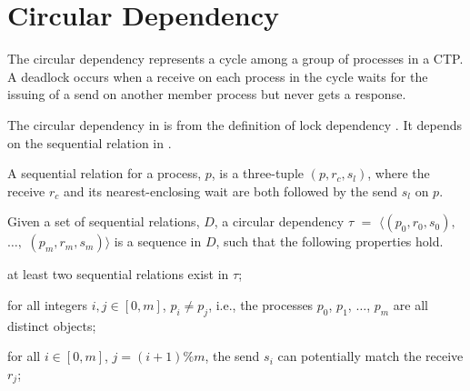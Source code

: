 \section{Circular Dependency}

\examplefigfour

The circular dependency represents a cycle among a group of processes in a CTP. A deadlock occurs when a receive on each process in the cycle waits for the issuing of a send on another member process but never gets a response. 

The circular dependency in  is from the definition of lock dependency \cite{DBLP:conf/pldi/JoshiPSN09}. It depends on the sequential relation in . 

\begin{definition}
A sequential relation for a process, $p$, is a three-tuple $(p, \mathit{r_c}, \mathit{s_l})$, where the receive $\mathit{r_c}$ and its nearest-enclosing wait are both followed by the send $\mathit{s_l}$ on $p$. 
\label{def:seqrelation}
\end{definition}

\begin{definition}
Given a set of sequential relations, $D$, a circular dependency $\tau$ $=$ $\langle(p_0, \mathit{r}_0, \mathit{s}_0),$ $\ldots,$ $(p_m, \mathit{r}_m, \mathit{s}_m)\rangle$ is a sequence in $D$, such that the following properties hold.
\begin{compactenum}
\item at least two sequential relations exist in $\tau$;
\item for all integers $i,j \in [0,m]$, $p_i \neq p_j$, i.e., the processes $p_0$, $p_1$, $\dots$, $p_m$ are all distinct objects;
\item for all $i \in [0,m]$, $j = (i+1) \% m$, the send $\mathit{s}_i$ can potentially match the receive $\mathit{r}_j$;
\end{compactenum}
\label{def:circular}
\end{definition}

